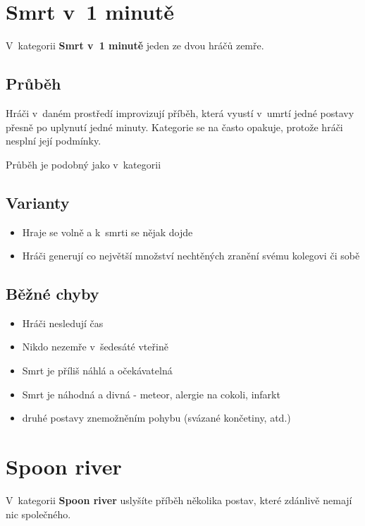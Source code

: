  
 
 
 
\needspace{5cm} \section{Smrt v~1 minutě} \label{smrt v~1 minutě}  
 
 
V~kategorii \textbf{Smrt v~1 minutě} jeden ze dvou hráčů zemře. 
 
\subsection{Průběh} Hráči v~daném prostředí improvizují příběh, která vyustí v~umrtí jedné postavy přesně po uplynutí jedné minuty. Kategorie se na  často opakuje, protože hráči nesplní její podmínky. 
 
Průběh je podobný jako v~kategorii  
 
\subsection{ Varianty } \begin{itemize}
\item Hraje se volně a k~smrti se nějak dojde
\item Hráči generují co největší množství nechtěných zranění svému kolegovi či sobě
\end{itemize}
 
\subsection{ Běžné chyby } \begin{itemize}
\item Hráči nesledují čas
\item Nikdo nezemře v~šedesáté vteřině
\item Smrt je příliš náhlá a očekávatelná
\item Smrt je náhodná a divná - meteor, alergie na cokoli, infarkt
\item {} druhé postavy znemožněním pohybu (svázané končetiny, atd.)
\end{itemize}
 
 
 
 
\needspace{5cm} \section{Spoon river} \label{spoon river}  
V~kategorii \textbf{Spoon river} uslyšíte příběh několika postav, které zdánlivě nemají nic společného. 
 
